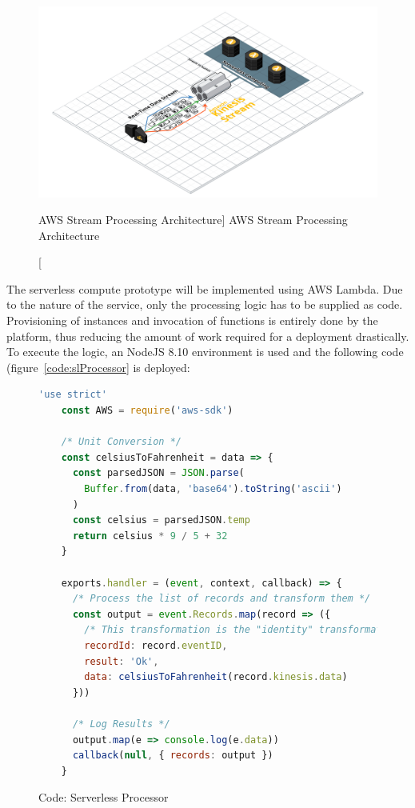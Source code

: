 \begin{figure}[ht]
    \includegraphics[width=\linewidth]{images/streaming/streamingaws.png}\centering
    \caption
    [AWS Stream Processing Architecture]
    {AWS Stream Processing Architecture}
    \label{fig:awsStreamingArchitecture}
\end{figure}

The serverless compute prototype will be implemented using AWS Lambda. Due to the nature of the service, only the processing logic has to be supplied as code. Provisioning of instances and invocation of functions is entirely done by the platform, thus reducing the amount of work required for a deployment drastically. To execute the logic, an NodeJS 8.10 environment is used and the following code (figure~\vref{code:slProcessor} is deployed:

\begin{figure}[ht]
    \begin{lstlisting}[language=js,firstnumber=1]
    'use strict'
    const AWS = require('aws-sdk')

    /* Unit Conversion */
    const celsiusToFahrenheit = data => {
      const parsedJSON = JSON.parse(
        Buffer.from(data, 'base64').toString('ascii')
      )
      const celsius = parsedJSON.temp
      return celsius * 9 / 5 + 32
    }
    
    exports.handler = (event, context, callback) => {
      /* Process the list of records and transform them */
      const output = event.Records.map(record => ({
        /* This transformation is the "identity" transformation, the data is left intact */
        recordId: record.eventID,
        result: 'Ok',
        data: celsiusToFahrenheit(record.kinesis.data)
      }))
    
      /* Log Results */
      output.map(e => console.log(e.data))
      callback(null, { records: output })
    }
    \end{lstlisting}\centering
    \caption{Code: Serverless Processor}
    \label{code:slProcessor}
\end{figure}

